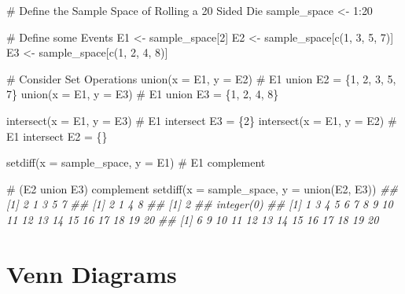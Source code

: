 \documentclass[
  letterpaper,
  DIV=11,
  numbers=noendperiod]{scrreprt}
\newenvironment{Shaded}{\begin{snugshade}}{\end{snugshade}}
\newcommand{\AttributeTok}[1]{\textcolor[rgb]{0.40,0.45,0.13}{#1}}
\newcommand{\CommentTok}[1]{\textcolor[rgb]{0.37,0.37,0.37}{#1}}
\newcommand{\DecValTok}[1]{\textcolor[rgb]{0.68,0.00,0.00}{#1}}
\newcommand{\DocumentationTok}[1]{\textcolor[rgb]{0.37,0.37,0.37}{\textit{#1}}}
\newcommand{\FunctionTok}[1]{\textcolor[rgb]{0.28,0.35,0.67}{#1}}
\newcommand{\NormalTok}[1]{\textcolor[rgb]{0.00,0.23,0.31}{#1}}
\newcommand{\OtherTok}[1]{\textcolor[rgb]{0.00,0.23,0.31}{#1}}
\newcommand{\SpecialCharTok}[1]{\textcolor[rgb]{0.37,0.37,0.37}{#1}}
\theoremstyle{definition}
\theoremstyle{definition}
\theoremstyle{definition}
\theoremstyle{remark}
\begin{document}
\begin{Shaded}
\begin{Highlighting}[]
\CommentTok{\# Define the Sample Space of Rolling a 20 Sided Die}
\NormalTok{sample\_space }\OtherTok{\textless{}{-}} \DecValTok{1}\SpecialCharTok{:}\DecValTok{20}

\CommentTok{\# Define some Events}
\NormalTok{E1 }\OtherTok{\textless{}{-}}\NormalTok{ sample\_space[}\DecValTok{2}\NormalTok{]}
\NormalTok{E2 }\OtherTok{\textless{}{-}}\NormalTok{ sample\_space[}\FunctionTok{c}\NormalTok{(}\DecValTok{1}\NormalTok{, }\DecValTok{3}\NormalTok{, }\DecValTok{5}\NormalTok{, }\DecValTok{7}\NormalTok{)]}
\NormalTok{E3 }\OtherTok{\textless{}{-}}\NormalTok{ sample\_space[}\FunctionTok{c}\NormalTok{(}\DecValTok{1}\NormalTok{, }\DecValTok{2}\NormalTok{, }\DecValTok{4}\NormalTok{, }\DecValTok{8}\NormalTok{)]}

\CommentTok{\# Consider Set Operations}
\FunctionTok{union}\NormalTok{(}\AttributeTok{x =}\NormalTok{ E1, }\AttributeTok{y =}\NormalTok{ E2) }\CommentTok{\# E1 union E2 = \{1, 2, 3, 5, 7\}}
\FunctionTok{union}\NormalTok{(}\AttributeTok{x =}\NormalTok{ E1, }\AttributeTok{y =}\NormalTok{ E3) }\CommentTok{\# E1 union E3 = \{1, 2, 4, 8\}}

\FunctionTok{intersect}\NormalTok{(}\AttributeTok{x =}\NormalTok{ E1, }\AttributeTok{y =}\NormalTok{ E3) }\CommentTok{\# E1 intersect E3 = \{2\}}
\FunctionTok{intersect}\NormalTok{(}\AttributeTok{x =}\NormalTok{ E1, }\AttributeTok{y =}\NormalTok{ E2) }\CommentTok{\# E1 intersect E2 = \{\}}

\FunctionTok{setdiff}\NormalTok{(}\AttributeTok{x =}\NormalTok{ sample\_space, }\AttributeTok{y =}\NormalTok{ E1) }\CommentTok{\# E1 complement}

\CommentTok{\# (E2 union E3) complement}
\FunctionTok{setdiff}\NormalTok{(}\AttributeTok{x =}\NormalTok{ sample\_space, }\AttributeTok{y =} \FunctionTok{union}\NormalTok{(E2, E3))}
\DocumentationTok{\#\# [1] 2 1 3 5 7}
\DocumentationTok{\#\# [1] 2 1 4 8}
\DocumentationTok{\#\# [1] 2}
\DocumentationTok{\#\# integer(0)}
\DocumentationTok{\#\#  [1]  1  3  4  5  6  7  8  9 10 11 12 13 14 15 16 17 18 19 20}
\DocumentationTok{\#\#  [1]  6  9 10 11 12 13 14 15 16 17 18 19 20}
\end{Highlighting}
\end{Shaded}

\section{Venn Diagrams}\label{venn-diagrams}
\end{document}
